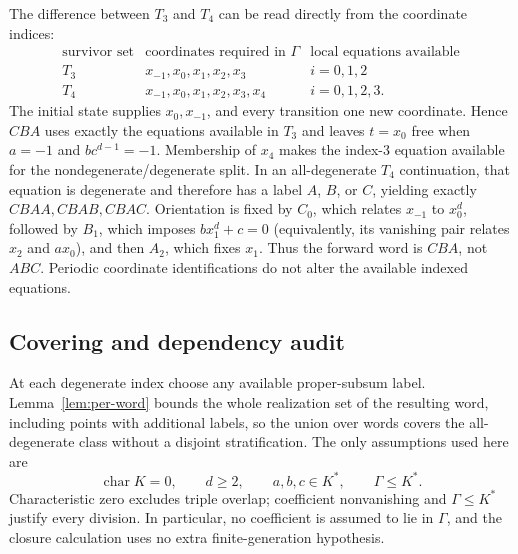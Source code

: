\documentclass[11pt]{article}
\theoremstyle{definition}
\theoremstyle{remark}
\begin{document}
The difference between \(T_3\) and \(T_4\) can be read directly from the
coordinate indices:
\[
\begin{array}{c|c|c}
\text{survivor set}&\text{coordinates required in }\Gamma&
   \text{local equations available}\\ \hline
T_3&x_{-1},x_0,x_1,x_2,x_3&i=0,1,2\\
T_4&x_{-1},x_0,x_1,x_2,x_3,x_4&i=0,1,2,3.
\end{array}
\]
The initial state supplies \(x_0,x_{-1}\), and every transition one new
coordinate.  Hence \(CBA\) uses exactly the equations available in \(T_3\)
and leaves \(t=x_0\) free when \(a=-1\) and \(bc^{d-1}=-1\).  Membership
of \(x_4\) makes the index-\(3\) equation available for the
nondegenerate/degenerate split.  In an all-degenerate \(T_4\) continuation,
that equation is degenerate and therefore has a label \(A\), \(B\), or
\(C\), yielding exactly \(CBAA,CBAB,CBAC\).  Orientation is
fixed by \(C_0\), which relates \(x_{-1}\) to \(x_0^d\), followed by
\(B_1\), which imposes \(b x_1^d+c=0\) (equivalently, its vanishing pair
relates \(x_2\) and \(a x_0\)), and then \(A_2\), which fixes \(x_1\).
Thus the forward word is \(CBA\), not \(ABC\).  Periodic coordinate
identifications do not alter the available indexed equations.

\subsection*{Covering and dependency audit}

At each degenerate index choose any available proper-subsum label.
Lemma~\ref{lem:per-word} bounds the whole realization set of the resulting
word, including points with additional labels, so the union over words
covers the all-degenerate class without a disjoint stratification.  The
only assumptions used here are
\[
 \operatorname{char}K=0,\qquad d\ge2,\qquad a,b,c\in K^\ast,\qquad
 \Gamma\le K^\ast.
\]
Characteristic zero excludes triple overlap; coefficient nonvanishing and
\(\Gamma\le K^\ast\) justify every division.  In particular, no coefficient
is assumed to lie in \(\Gamma\), and the closure calculation uses no extra
finite-generation hypothesis.



\end{document}

